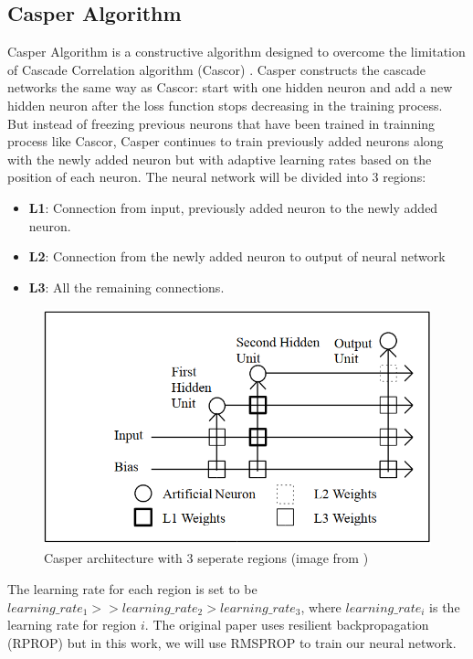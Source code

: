 \documentclass[runningheads]{llncs}
\begin{document}
\subsection{Casper Algorithm}
Casper Algorithm \cite{casper_paper} is a constructive algorithm designed to overcome the limitation of Cascade Correlation algorithm (Cascor) \cite{cascor_paper}. Casper constructs the cascade networks the same way as Cascor: start with one hidden neuron and add a new hidden neuron after the loss function stops decreasing in the training process. But instead of freezing previous neurons that have been trained in trainning process like Cascor, Casper continues to train previously added neurons along with the newly added neuron but with adaptive learning rates based on the position of each neuron. The neural network will be divided into 3 regions:
\begin{itemize}
    \item \textbf{L1}: Connection from input, previously added neuron to the newly added neuron.
    \item \textbf{L2}: Connection from the newly added neuron to output of neural network
    \item \textbf{L3}: All the remaining connections.
\end{itemize}
\begin{figure}
    \centering
    \includegraphics[scale=0.4]{casper_architecture.PNG}
    \caption{Casper architecture with 3 seperate regions (image from \cite{cascor_paper})}
    \label{fig:casper}
\end{figure}
The learning rate for each region is set to be $learning\_rate_1 >> learning\_rate_2 > learning\_rate_3$, where $learning\_rate_{i}$ is the learning rate for region $i$. The original paper uses resilient backpropagation (RPROP) but in this work, we will use RMSPROP \cite{rmsprop} to train our neural network.
\end{document}

